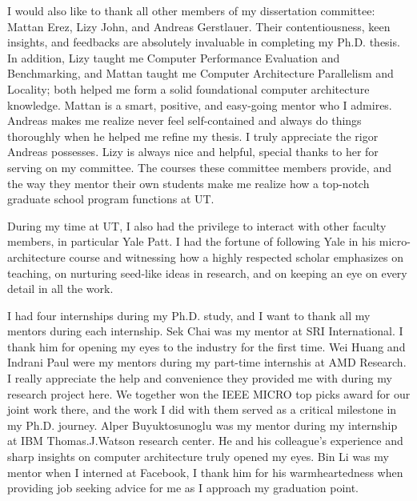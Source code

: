 \begin{acknowledgments}
I would also like to thank all other members of my dissertation committee: Mattan Erez, Lizy John, and Andreas Gerstlauer. Their contentiousness, keen insights, and feedbacks are absolutely invaluable in completing my Ph.D. thesis. In addition, Lizy taught me Computer Performance Evaluation and Benchmarking, and Mattan taught me Computer Architecture Parallelism and Locality; both helped me form a solid foundational computer architecture knowledge. Mattan is a smart, positive, and easy-going mentor who I admires. Andreas makes me realize never feel self-contained and always do things thoroughly when he helped me refine my thesis. I truly appreciate the rigor Andreas possesses. Lizy is always nice and helpful, special thanks to her for serving on my committee. The courses these committee members provide, and the way they mentor their own students make me realize how a top-notch graduate school program functions at UT.

During my time at UT, I also had the privilege to interact with other faculty members, in particular Yale Patt. I had the fortune of following Yale in his micro-architecture course and witnessing how a highly respected scholar emphasizes on teaching, on nurturing seed-like ideas in research, and on keeping an eye on every detail in all the work. 

I had four internships during my Ph.D. study, and I want to thank all my mentors during each internship. Sek Chai was my mentor at SRI International. I thank him for opening my eyes to the industry for the first time. Wei Huang and Indrani Paul were my mentors during my part-time internshis at AMD Research. I really appreciate the help and convenience they provided me with during my research project here. We together won the IEEE MICRO top picks award for our joint work there, and the work I did with them served as a critical milestone in my Ph.D. journey. Alper Buyuktosunoglu was my mentor during my internship at IBM Thomas.J.Watson research center. He and his colleague's experience and sharp insights on computer architecture truly opened my eyes. Bin Li was my mentor when I interned at Facebook, I thank him for his warmheartedness when providing job seeking advice for me as I approach my graduation point.



\end{acknowledgments}
